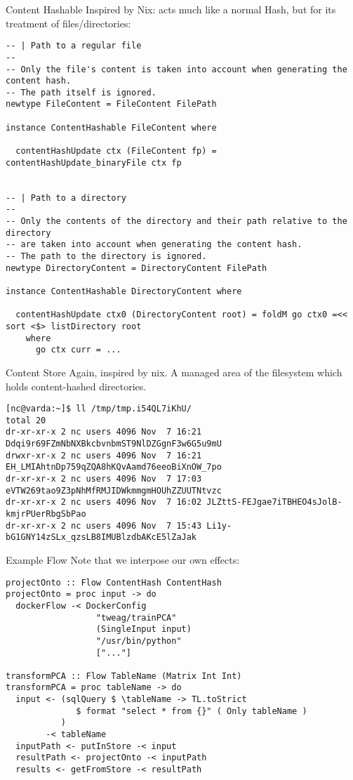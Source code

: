 \documentclass[11pt]{beamer}
\begin{document}
\begin{frame}[fragile]{Content Hashable}
Inspired by Nix: acts much like a normal Hash, but for its treatment of files/directories:
\begin{lstlisting}[basicstyle=\tiny]
-- | Path to a regular file
--
-- Only the file's content is taken into account when generating the content hash.
-- The path itself is ignored.
newtype FileContent = FileContent FilePath

instance ContentHashable FileContent where

  contentHashUpdate ctx (FileContent fp) = contentHashUpdate_binaryFile ctx fp


-- | Path to a directory
--
-- Only the contents of the directory and their path relative to the directory
-- are taken into account when generating the content hash.
-- The path to the directory is ignored.
newtype DirectoryContent = DirectoryContent FilePath

instance ContentHashable DirectoryContent where

  contentHashUpdate ctx0 (DirectoryContent root) = foldM go ctx0 =<< sort <$> listDirectory root
    where
      go ctx curr = ...
\end{lstlisting}
\end{frame}

\begin{frame}[fragile]{Content Store}
Again, inspired by nix. A managed area of the filesystem which holds content-hashed directories.
\begin{lstlisting}[basicstyle=\tiny]
[nc@varda:~]$ ll /tmp/tmp.i54QL7iKhU/
total 20
dr-xr-xr-x 2 nc users 4096 Nov  7 16:21 Ddqi9r69FZmNbNXBkcbvnbmST9NlDZGgnF3w6G5u9mU
drwxr-xr-x 2 nc users 4096 Nov  7 16:21 EH_LMIAhtnDp759qZQA8hKQvAamd76eeoBiXnOW_7po
dr-xr-xr-x 2 nc users 4096 Nov  7 17:03 eVTW269tao9Z3pNhMfRMJIDWkmmgmHOUhZZUUTNtvzc
dr-xr-xr-x 2 nc users 4096 Nov  7 16:02 JLZttS-FEJgae7iTBHEO4sJolB-kmjrPUerRbgSbPao
dr-xr-xr-x 2 nc users 4096 Nov  7 15:43 Li1y-bG1GNY14zSLx_qzsLB8IMUBlzdbAKcE5lZaJak

\end{lstlisting}
\end{frame}

\begin{frame}[fragile]{Example Flow}
Note that we interpose our own effects:
\begin{lstlisting}[basicstyle=\tiny]
projectOnto :: Flow ContentHash ContentHash
projectOnto = proc input -> do
  dockerFlow -< DockerConfig
                  "tweag/trainPCA"
                  (SingleInput input)
                  "/usr/bin/python"
                  ["..."]

transformPCA :: Flow TableName (Matrix Int Int)
transformPCA = proc tableName -> do
  input <- (sqlQuery $ \tableName -> TL.toStrict
              $ format "select * from {}" ( Only tableName )
           )
        -< tableName
  inputPath <- putInStore -< input
  resultPath <- projectOnto -< inputPath
  results <- getFromStore -< resultPath
\end{lstlisting}
\end{frame}
\end{document}
